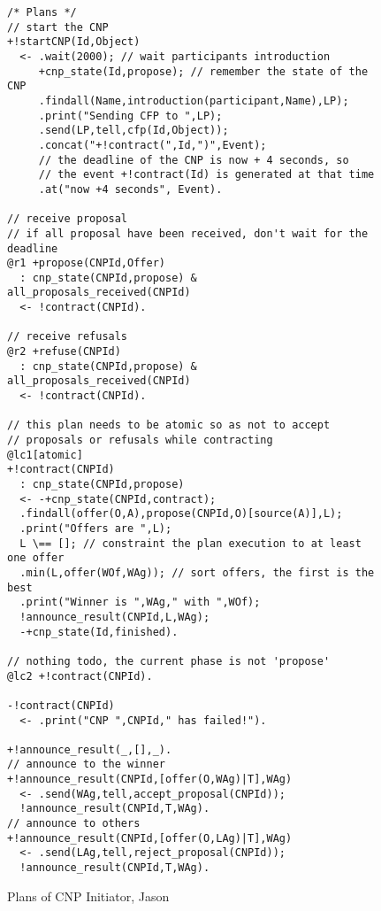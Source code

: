 \documentclass[a4paper,12pt,oneside,fleqn]{book} %
\begin{document}
\begin{figure}\footnotesize %
\begin{verbatim}
/* Plans */
// start the CNP
+!startCNP(Id,Object)
  <- .wait(2000); // wait participants introduction
     +cnp_state(Id,propose); // remember the state of the CNP
     .findall(Name,introduction(participant,Name),LP);
     .print("Sending CFP to ",LP);
     .send(LP,tell,cfp(Id,Object));
     .concat("+!contract(",Id,")",Event);
     // the deadline of the CNP is now + 4 seconds, so
     // the event +!contract(Id) is generated at that time
     .at("now +4 seconds", Event).

// receive proposal
// if all proposal have been received, don't wait for the deadline
@r1 +propose(CNPId,Offer)
  : cnp_state(CNPId,propose) & all_proposals_received(CNPId)
  <- !contract(CNPId).

// receive refusals
@r2 +refuse(CNPId)
  : cnp_state(CNPId,propose) & all_proposals_received(CNPId)
  <- !contract(CNPId).

// this plan needs to be atomic so as not to accept
// proposals or refusals while contracting
@lc1[atomic]
+!contract(CNPId)
  : cnp_state(CNPId,propose)
  <- -+cnp_state(CNPId,contract);
  .findall(offer(O,A),propose(CNPId,O)[source(A)],L);
  .print("Offers are ",L);
  L \== []; // constraint the plan execution to at least one offer
  .min(L,offer(WOf,WAg)); // sort offers, the first is the best
  .print("Winner is ",WAg," with ",WOf);
  !announce_result(CNPId,L,WAg);
  -+cnp_state(Id,finished).

// nothing todo, the current phase is not 'propose'
@lc2 +!contract(CNPId).

-!contract(CNPId)
  <- .print("CNP ",CNPId," has failed!").

+!announce_result(_,[],_).
// announce to the winner
+!announce_result(CNPId,[offer(O,WAg)|T],WAg)
  <- .send(WAg,tell,accept_proposal(CNPId));
  !announce_result(CNPId,T,WAg).
// announce to others
+!announce_result(CNPId,[offer(O,LAg)|T],WAg)
  <- .send(LAg,tell,reject_proposal(CNPId));
  !announce_result(CNPId,T,WAg).
\end{verbatim}
\caption{Plans of CNP Initiator, Jason}
\label{fig:jasonInP}
\end{figure} %
\end{document}
